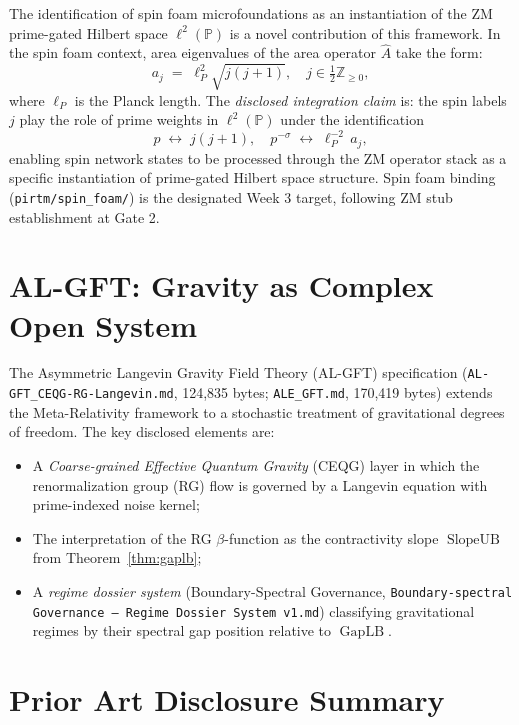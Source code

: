 \documentclass[12pt,letterpaper]{article}
\theoremstyle{definition}
\theoremstyle{remark}
\begin{document}
The identification of spin foam microfoundations as an instantiation of the
ZM prime-gated Hilbert space $\ell^2(\mathbb{P})$ is a novel contribution
of this framework. In the spin foam context, area eigenvalues of the area
operator $\hat{A}$ take the form:
\[
  a_j \;=\; \ell_P^2 \sqrt{j(j+1)},
  \quad j \in \tfrac{1}{2}\mathbb{Z}_{\geq 0},
\]
where $\ell_P$ is the Planck length. The \emph{disclosed integration claim}
is: the spin labels $j$ play the role of prime weights in $\ell^2(\mathbb{P})$
under the identification
\[
  p \;\longleftrightarrow\; j(j+1),
  \quad
  p^{-\sigma} \;\longleftrightarrow\; \ell_P^{-2}\, a_j,
\]
enabling spin network states to be processed through the ZM operator stack as
a specific instantiation of prime-gated Hilbert space structure. Spin foam
binding (\texttt{pirtm/spin\_foam/}) is the designated Week 3 target,
following ZM stub establishment at Gate 2.

\section{AL-GFT: Gravity as Complex Open System}
\label{sec:algft}

The Asymmetric Langevin Gravity Field Theory (AL-GFT) specification
(\texttt{AL-GFT\_CEQG-RG-Langevin.md}, 124,835 bytes; \texttt{ALE\_GFT.md},
170,419 bytes) extends the Meta-Relativity framework to a stochastic
treatment of gravitational degrees of freedom. The key disclosed elements are:

\begin{itemize}[leftmargin=*]
  \item A \emph{Coarse-grained Effective Quantum Gravity} (CEQG) layer in which
        the renormalization group (RG) flow is governed by a Langevin equation
        with prime-indexed noise kernel;
  \item The interpretation of the RG $\beta$-function as the contractivity
        slope $\operatorname{SlopeUB}$ from Theorem~\ref{thm:gaplb};
  \item A \emph{regime dossier system} (Boundary-Spectral Governance,
        \texttt{Boundary-spectral Governance --- Regime Dossier System v1.md})
        classifying gravitational regimes by their spectral gap position
        relative to $\operatorname{GapLB}$.
\end{itemize}

\section{Prior Art Disclosure Summary}
\label{sec:prior-art}
\end{document}

